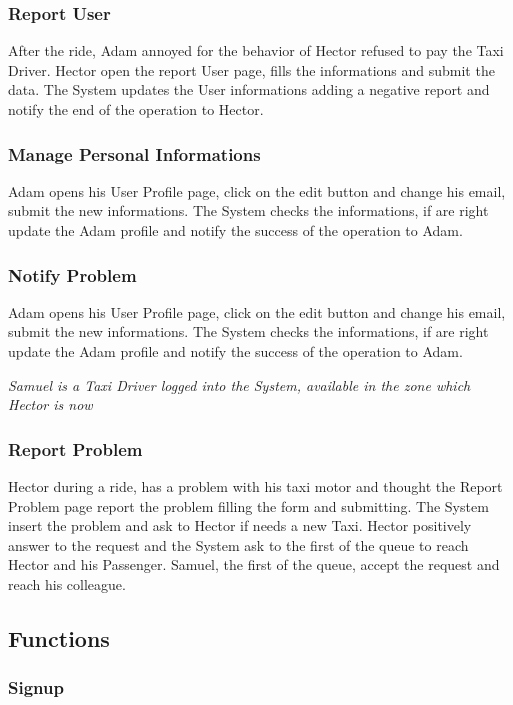 \documentclass[english]{article}
\begin{document}
\subsubsection{Report User}
After the ride, Adam annoyed for the behavior of Hector refused to pay the Taxi Driver. Hector open the report User page, fills the informations and submit the data. The System updates the User informations adding a negative report and notify the end of the operation to Hector. 

\subsubsection{Manage Personal Informations}
Adam opens his User Profile page, click on the edit button and change his email, submit the new informations. The System checks the informations, if are right update the Adam profile and notify the success of the operation to Adam.

\subsubsection{Notify Problem}
Adam opens his User Profile page, click on the edit button and change his email, submit the new informations. The System checks the informations, if are right update the Adam profile and notify the success of the operation to Adam.

\emph{Samuel is a Taxi Driver logged into the System, available in the zone which Hector is now}

\subsubsection{Report Problem}
Hector during a ride, has a problem with his taxi motor and thought the Report Problem page report the problem filling the form and submitting. The System insert the problem and ask to Hector if needs a new Taxi. Hector positively answer to the request and the System ask to the first of the queue to reach Hector and his Passenger. Samuel, the first of the queue, accept the request and reach his colleague.

\subsection{Functions}

\subsubsection{Signup}
\end{document}
